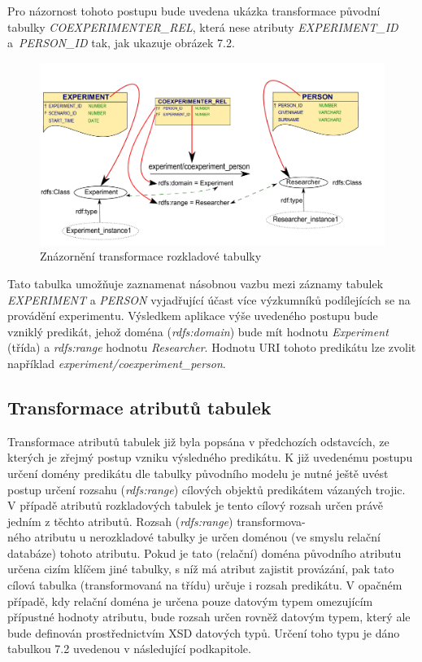 \documentclass{projekt}
\begin{document}
Pro názornost tohoto postupu bude uvedena ukázka transformace původní tabulky {\it COEXPERIMENTER\_REL}, která nese atributy {\it EXPERIMENT\_ID} a~{\it PERSON\_ID} tak, jak ukazuje obrázek 7.2.


\begin{figure}[htb]
\begin{center}
\includegraphics[scale=0.5]{rozkladovka.pdf}
\caption{Znázornění transformace rozkladové tabulky}
\end{center}
\end{figure}


Tato tabulka umožňuje zaznamenat násobnou vazbu mezi záznamy tabulek {\it EXPERIMENT} a {\it PERSON} vyjadřující účast více výzkumníků podílejících se na provádění experimentu. Výsledkem aplikace výše uvedeného postupu bude vzniklý predikát, jehož doména ({\it rdfs:domain}) bude mít hodnotu {\it Experiment} (třída) a {\it rdfs:range} hodnotu {\it Researcher}. Hodnotu URI tohoto predikátu lze zvolit například {\it experiment/coexperiment\_person}.


\subsection{Transformace atributů tabulek}
\hspace{0.65cm}Transformace atributů tabulek již byla popsána v předchozích odstavcích, ze kterých je zřejmý postup vzniku výsledného predikátu. K již uvedenému postupu určení domény predikátu dle tabulky původního modelu je nutné ještě uvést postup určení rozsahu ({\it rdfs:range}) cílových objektů predikátem vázaných trojic. V případě atributů rozkladových tabulek je tento cílový rozsah určen právě jedním z těchto atributů. Rozsah ({\it rdfs:range})  transformova-\\ného atributu u nerozkladové tabulky je určen doménou (ve smyslu relační databáze) tohoto atributu. Pokud je tato (relační) doména původního atributu určena cizím klíčem jiné tabulky, s níž má atribut zajistit provázání, pak tato cílová tabulka (transformovaná na třídu) určuje i rozsah predikátu. V opačném případě, kdy relační doména je určena pouze datovým typem omezujícím přípustné hodnoty atributu, bude rozsah určen rovněž datovým typem, který ale bude definován prostřednictvím XSD datových typů. Určení toho typu je dáno tabulkou 7.2 uvedenou v následující podkapitole.
\end{document}
